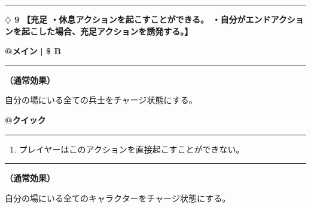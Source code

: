 \documentclass[twocolumn,a5paper,papersize,10pt]{jarticle}
\begin{document}
\vspace{-1zh}
  
 

\vspace{3mm} %
\hrule height 0.5mm depth 0mm width 66.5mm %
\vspace{1mm} %
{\Large\bf $\diamondsuit$ 9} {\normalsize\bf【充足 ・休息アクションを起こすことができる。 ・自分がエンドアクションを起こした場合、充足アクションを誘発する。】} %
\vspace{1mm} %



\begin{tcolorbox}[title={\small\bf【Action】休息}{\scriptsize （通常魔法）}]

{\scriptsize\bf @メイン }
  {\scriptsize\bf | \$ B }

\vspace{1mm} %
\hrule height 0.1mm depth 0mm width 62mm %
\vspace{1mm} %

{\bf（通常効果）}

自分の場にいる全ての兵士をチャージ状態にする。

\vspace{1mm} %
\end{tcolorbox}

\vspace{-1zh}
\begin{tcolorbox}[title={\small\bf【Action】充足}{\scriptsize （誘発）}]

{\scriptsize\bf @クイック }

\vspace{1mm} %
\hrule height 0.1mm depth 0mm width 62mm %
\vspace{1mm} %


\vspace{-1zh}%
\begin{enumerate}
\renewcommand{\labelenumi}{※}
\setlength{\leftskip}{-0.3cm}
\setlength{\itemsep}{0pt} %
\setlength{\parskip}{0pt} %

\item プレイヤーはこのアクションを直接起こすことができない。

\vspace{-3mm}%
\end{enumerate}
\vspace{-2mm} %
\vspace{1zh}%
\vspace{1mm} %
\hrule height 0.1mm depth 0mm width 62mm %
\vspace{1mm} %

{\bf（通常効果）}

自分の場にいる全てのキャラクターをチャージ状態にする。

\vspace{1mm} %
\end{tcolorbox}
\end{document}
